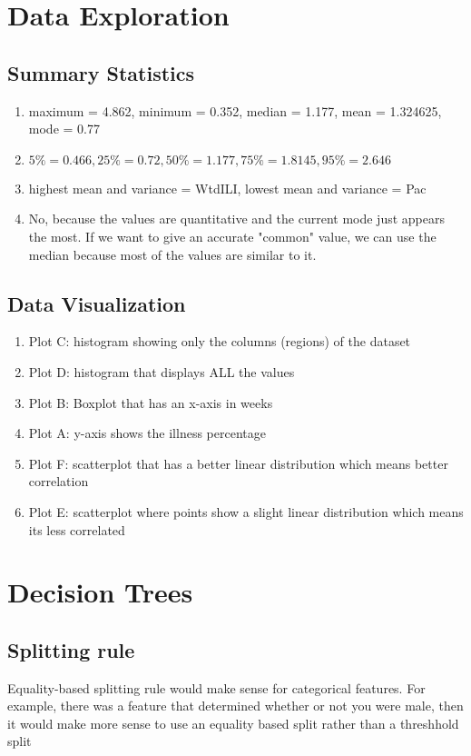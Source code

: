 \documentclass[letterpaper,12pt]{article}
\begin{document}
    \section{Data Exploration}
    \subsection{Summary Statistics}
    \begin{enumerate}
        \item maximum = 4.862, minimum = 0.352, median = 1.177, mean = 1.324625, mode = 0.77
        \item $5\% = 0.466, 25\% = 0.72, 50\% = 1.177, 75\% = 1.8145, 95\% = 2.646$
        \item highest mean and variance = WtdILI, lowest mean and variance = Pac
        \item No, because the values are quantitative and the current mode just appears the most. If we want to give an accurate "common" value, we can use the median because most of the values are similar to it.
    \end{enumerate}

    \subsection{Data Visualization}
    \begin{enumerate}
        \item Plot C: histogram showing only the columns (regions) of the dataset
        \item Plot D: histogram that displays ALL the values
        \item Plot B: Boxplot that has an x-axis in weeks
        \item Plot A: y-axis shows the illness percentage
        \item Plot F: scatterplot that has a better linear distribution which means better correlation
        \item Plot E: scatterplot where points show a slight linear distribution which means its less correlated
    \end{enumerate}

    \section{Decision Trees}
    \subsection{Splitting rule}
    \begin{description} Equality-based splitting rule would make sense for categorical features. For example, there was a feature that determined whether or not you were male, then it would make more sense to use an equality based split rather than a threshhold split \end{description}
    
\end{document}
